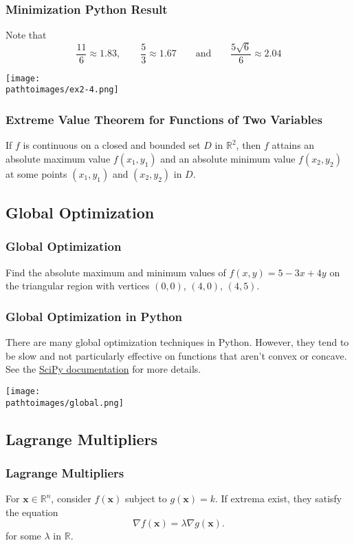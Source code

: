 \documentclass{beamer}
\newcommand{\pathtoimages}{/Users/charlesrambo/Desktop/Bootcamp24/Images}
\begin{document}
\begin{frame}
\frametitle{Minimization Python Result}
Note that
$$
\frac{11}{6} \approx 1.83,\qquad \frac{5}{3} \approx 1.67\qquad\text{and}\qquad \frac{5\sqrt{6}}{6}\approx 2.04
$$
\begin{center}
\texttt{[image: \\pathtoimages/ex2-4.png]}
\end{center}
\end{frame}

\begin{frame}
\frametitle{Extreme Value Theorem for Functions of Two Variables}
\begin{Theorem}
If $f$ is continuous on a closed and bounded set $D$ in $\mathbb{R}^2$, then $f$ attains an absolute maximum value $f(x_1, y_1)$ and an absolute minimum value $f(x_2, y_2)$ at some points $(x_1, y_1)$ and $(x_2, y_2)$ in $D$.
\end{Theorem}
\end{frame}

\subsection{Global Optimization}

\begin{frame}[t]
\frametitle{Global Optimization}
\begin{Example}
Find the absolute maximum and minimum values of $f(x, y) = 5 - 3x + 4y$ on the triangular region with vertices $(0, 0)$, $(4, 0)$, $(4, 5)$.
\end{Example}
\end{frame}

\begin{frame}
\frametitle{Global Optimization in Python}
\tiny
There are many global optimization techniques in Python. However, they tend to be slow and not particularly effective on functions that aren't convex or concave. See the \href{https://docs.scipy.org/doc/scipy/reference/optimize.html}{SciPy documentation} for more details. 
\begin{center}
\texttt{[image: \\pathtoimages/global.png]}
\end{center}
\end{frame}

\subsection{Lagrange Multipliers}

\begin{frame}
\frametitle{Lagrange Multipliers}
For ${\boldsymbol x}\in \mathbb{R}^n$, consider $f({\boldsymbol x})$ subject to $g({\boldsymbol x}) = k$. If extrema exist, they satisfy the equation
$$
\nabla f({\boldsymbol x}) = \lambda \nabla g({\boldsymbol x}).
$$
for some $\lambda$ in $\mathbb{R}$.
\end{frame}
\end{document}
